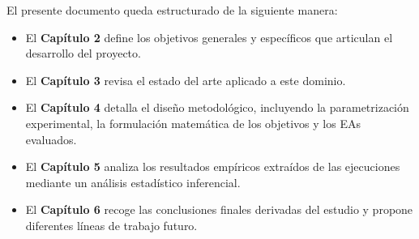 El presente documento queda estructurado de la siguiente manera:
\begin{itemize}
    \item El \textbf{Capítulo 2} define los objetivos generales y específicos que articulan el desarrollo del proyecto.
    \item El \textbf{Capítulo 3} revisa el estado del arte aplicado a este dominio.
    \item El \textbf{Capítulo 4} detalla el diseño metodológico, incluyendo la parametrización experimental, la formulación matemática de los objetivos y los EAs evaluados.
    \item El \textbf{Capítulo 5} analiza los resultados empíricos extraídos de las ejecuciones mediante un análisis estadístico inferencial.
    \item El \textbf{Capítulo 6} recoge las conclusiones finales derivadas del estudio y propone diferentes líneas de trabajo futuro.
\end{itemize}